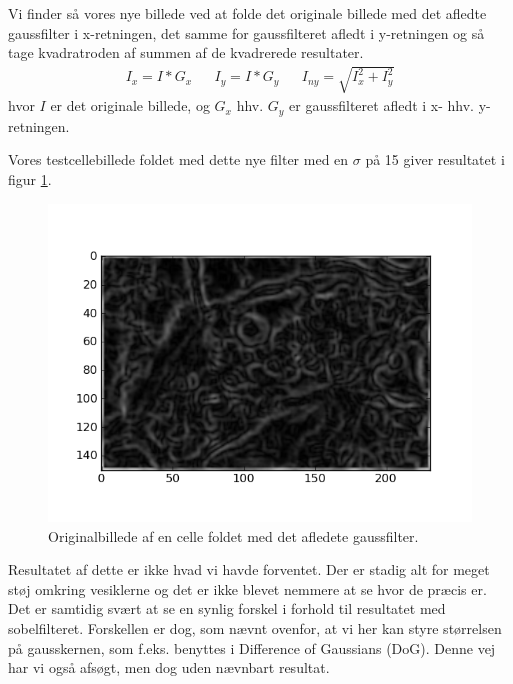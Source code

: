 Vi finder så vores nye billede ved at folde det originale billede med det afledte gaussfilter i x-retningen, det samme for gaussfilteret afledt i y-retningen og så tage kvadratroden af summen af de kvadrerede resultater.
\begin{align}
	I_x = I * G_x && I_y = I * G_y && I_{ny} = \sqrt{I_x^2+I_y^2}
\end{align} 
hvor $I$ er det originale billede, og $G_x$ hhv. $G_y$ er gaussfilteret afledt i x- hhv. y-retningen.

Vores testcellebillede foldet med dette nye filter med en $\sigma$ på 15 giver resultatet i figur \ref{fig:premethod_gaussCell}.
\begin{figure}[H]
	\centering
	\includegraphics[scale=0.8]{files/premethod/img/gauss_derived_cell2.png}
	\caption{Originalbillede af en celle foldet med det afledete gaussfilter.\label{fig:premethod_gaussCell}}
\end{figure}

Resultatet af dette er ikke hvad vi havde forventet. Der er stadig alt for meget støj omkring vesiklerne og det er ikke blevet nemmere at se hvor de præcis er. Det er samtidig svært at se en synlig forskel i forhold til resultatet med sobelfilteret. Forskellen er dog, som nævnt ovenfor, at vi her kan styre størrelsen på gausskernen, som f.eks. benyttes i Difference of Gaussians (DoG). Denne vej har vi også afsøgt, men dog uden nævnbart resultat. 


